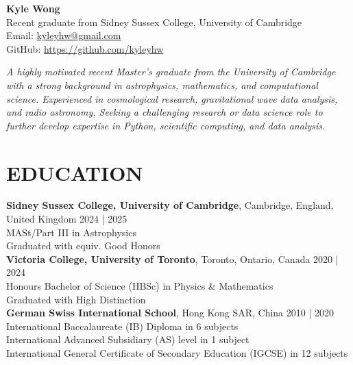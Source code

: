 \documentclass[a4paper,10pt]{extarticle}
\begin{document}
\pagestyle{fancy}
\renewcommand{\headrulewidth}{0pt}
\fancyhead{}
\fancyhead[R]{\textit{\monthyeardate\today}}
\thispagestyle{empty} %

\begin{flushleft}
\textbf{\LARGE Kyle Wong}\\[0.5em] %
Recent graduate from Sidney Sussex College, University of Cambridge
\\ Email: \href{mailto:kyleyhw@gmail.com}{kyleyhw@gmail.com} %
\\ GitHub: \url{https://github.com/kyleyhw}

\vspace{1em}
\textit{A highly motivated recent Master's graduate from the University of Cambridge with a strong background in astrophysics, mathematics, and computational science. Experienced in cosmological research, gravitational wave data analysis, and radio astronomy. Seeking a challenging research or data science role to further develop expertise in Python, scientific computing, and data analysis.}
\end{flushleft}

\section*{EDUCATION}
\textbf{Sidney Sussex College, University of Cambridge}, Cambridge, England, United Kingdom \hfill 2024 | 2025\\
MASt/Part III in Astrophysics\\
Graduated with equiv. Good Honors\\



\textbf{Victoria College, University of Toronto}, Toronto, Ontario, Canada \hfill 2020 | 2024\\ %
Honours Bachelor of Science (HBSc) in Physics \& Mathematics\\
Graduated with High Distinction\\


\textbf{German Swiss International School}, Hong Kong SAR, China \hfill 2010 | 2020\\ %
International Baccalaureate (IB) Diploma in 6 subjects\\
International Advanced Subsidiary (AS) level in 1 subject\\
International General Certificate of Secondary Education (IGCSE) in 12 subjects
\end{document}
